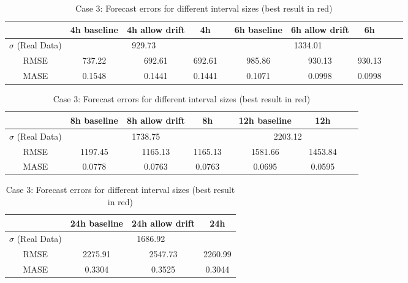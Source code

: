 \begin{table}[h]
\footnotesize
\begin{tabular}{c|ccccccccc}
              & 4h baseline & 4h allow drift & 4h     &  & 6h baseline & 6h allow drift & 6h     &  &  \\ \hline
$\sigma$ (Real Data) & \multicolumn{3}{c}{929.73}           &  & \multicolumn{3}{c}{1334.01}           &  &  \\
RMSE          & 737.22      & 692.61         & 692.61 &  & 985.86      & 930.13        & 930.13 &  &  \\
MASE          & 0.1548      & 0.1441         & 0.1441 &  & 0.1071      & 0.0998        & 0.0998 &  & 
\end{tabular}

\vspace{0.5cm}

\begin{tabular}{c|ccccccccc}
              & 8h baseline & 8h allow drift & 8h     &  & 12h baseline & \color{red}{12h allow drift} & 12h     &  &  \\ \hline
$\sigma$ (Real Data) & \multicolumn{3}{c}{1738.75}           &  & \multicolumn{3}{c}{2203.12}           &  &  \\
RMSE          & 1197.45     & 1165.13        & 1165.13  &  & 1581.66     & \color{red}{1453.84}      & 1453.84 &  &  \\
MASE          & 0.0778      & 0.0763         & 0.0763  &  & 0.0695      & \color{red}{0.0595}        & 0.0595 &  & 
\end{tabular}

\vspace{0.5cm}

\begin{tabular}{c|ccc}
              & 24h baseline & 24h allow drift & 24h  \\ \hline
$\sigma$ (Real Data) & \multicolumn{3}{c}{1686.92}     \\
RMSE          & 2275.91     & 2547.73         & 2260.99   \\
MASE          & 0.3304      & 0.3525         & 0.3044 \\
\end{tabular}

\vspace{0.5cm}

\caption{Case 3: Forecast errors for different interval sizes (best result in
red)}\label{tab:case3_interval}
\end{table}


